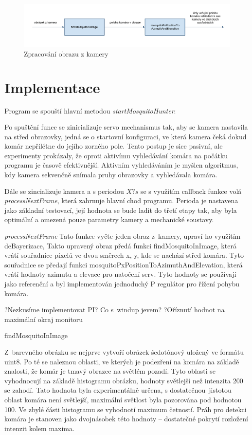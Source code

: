 \documentclass[a4paper,10pt]{article}
\begin{document}
\begin{figure}[!htb]
    \centering
     \includegraphics[width=1\columnwidth]{pics/zpracovani_obrazu_z_kamery}
     \caption{Zpracování obrazu z kamery\label{fig:rid_system}}
\end{figure}

\section{Implementace}

Program se spouští hlavní metodou \textit{startMosquitoHunter}:

Po spuštění funce se zinicializuje servo mechanismus tak, aby se kamera nastavila na střed obrazovky, jedná se o startovní konfiguraci, ve která kamera čeká dokud komár nepřilétne do jejího zorného pole. Tento postup je sice pasivní, ale experimenty prokázaly, že oproti aktivímu vyhledávání komára na počátku programu je časově efektivnější. Aktivním vyhledáváním je myšlen algoritmus, kdy kamera sekvenčně snímala pruhy obrazovky a vyhledávala komára.

Dále se zincializuje kamera a s periodou $X? s$ se s využitím callback funkce volá \textit{processNextFrame}, která zahrnuje hlavní chod programu. Perioda je nastavena jako základní testovací, její hodnota se bude ladit do třetí etapy tak, aby byla optimální a omezená pouze parametry kamery a mechanické soustavy. 

\textit{processNextFrame}
Tato funkce vyčte jeden obraz z kamery, upraví ho využitím deBayerizace, Takto upravený obraz předá funkci findMosquitoInImage, která vrátí souřadnice pixelů ve dvou směrech x, y, kde se nachází střed komára. Tyto souřadnice se předají funkci mosquitoPxPositionToAzimuthAndElevation, která vrátí hodnoty azimutu a elevace pro natočení serv. Tyto hodnoty se používají jako referenční a byl implementován jednoduchý P regulátor pro řížení pohybu komára.

?Nezkusíme implementovat PI? Co s windup jevem?
?Oříznutí hodnot na maximální okraj monitoru

findMosquitoInImage

Z barevného obrázku se nejprve vytvoří obrázek šedotónový uložený ve formátu uint8. Po té se naleznou oblasti, ve kterých je podezření na komára na základě znalosti, že komár je tmavý obrazec na světlém pozadí. Tyto oblasti se vyhodnocují na základě histogramu obrázku, hodnoty světlejší než intenzita 200 se zahodí. Tato hodnota byla experimentálně určena, s dostatečnou jistotou oblast komára není světlejší, maximální světlost byla pozorována pod hodnotou 100. Ve zbylé části histogramu se vyhodnotí maximum četností. Práh pro detekci komára je stanoven jako dvojnásobek této hodnoty – dostatečné pokrytí rozložení intenzit kolem maxima. 
\end{document}
